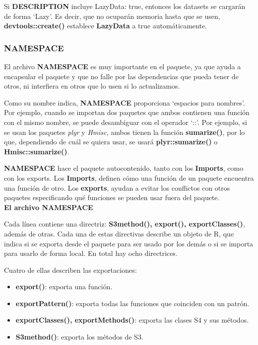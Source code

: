 Si \textbf{DESCRIPTION} incluye LazyData: true, entonces los datasets se cargar\'an de forma
\enquote*{Lazy}. Es decir, que no ocupar\'an memoria hasta que se usen, \textbf{devtools::create()} establece
\textbf{LazyData} a true autom\'aticamente.

\subsubsection{NAMESPACE}

El archivo \textbf{NAMESPACE} es muy importante en el paquete, ya que ayuda a encapsular el paquete y que no falle por las dependencias que pueda tener de otros, ni
interfiera en otros que lo usen si lo actualizamos.

Como su nombre indica, \textbf{NAMESPACE} proporciona \enquote*{espacios para nombres}. Por ejemplo,
cuando se importan dos paquetes que ambos contienen una funci\'on con el mismo nombre,
se puede desambiguar con el operador \enquote*{::}. Por ejemplo, si se usan los paquetes \textit{plyr} y
\textit{Hmisc}, ambos tienen la funci\'on \textbf{sumarize()}, por lo que, dependiendo de cu\'al se quiera usar,
se usar\'a \textbf{plyr::sumarize()} o \textbf{Hmisc::sumarize()}.

\textbf{NAMESPACE} hace el paquete autocontenido, tanto con los \textbf{Imports}, como con los
exports. Los \textbf{Imports}, definen c\'omo una funci\'on de un paquete encuentra una funci\'on de
otro. Los \textbf{exports}, ayudan a evitar los conflictos con otros paquetes especificando qu\'e
funciones se pueden usar fuera del paquete.\\

\textbf{El archivo NAMESPACE}

Cada l\'inea contiene una directriz: \textbf{S3method(), export(), exportClasses()}, adem\'as de otras.
Cada una de estas directivas describe un objeto de R, que indica si se exporta desde
el paquete para ser usado por los dem\'as o si se importa para usarlo de forma local.
En total hay ocho directrices. 

Cuatro de ellas describen las exportaciones:

\begin{itemize}
    \item \textbf{ export()}: exporta una funci\'on.
    \item \textbf{ exportPattern()}: exporta todas las funciones que coinciden con un patr\'on.
    \item \textbf{ exportClasses(), exportMethods()}: exporta las clases S4 y sus m\'etodos.
    \item \textbf{ S3method()}: exporta los m\'etodos de S3.
\end{itemize}

